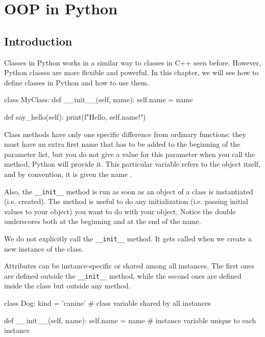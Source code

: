 
\chapter{OOP in Python}

\section{Introduction}

Classes in Python works in a similar way to classes in C++ seen before. However, Python classes are more flexible and powerful. In this chapter, we will see how to define classes in Python and how to use them.

\begin{codeblock}[language=Python]
class MyClass:
    def __init__(self, name):
        self.name = name

    def say_hello(self):
        print(f"Hello, {self.name}!")
\end{codeblock}

\begin{observationblock}
    Class methods have only one specific difference from ordinary functions: they must have an extra
    first name that has to be added to the beginning of the parameter list, but you do not give a value
    for this parameter when you call the method, Python will provide it. This particular variable refers
    to the object itself, and by convention, it is given the name .
\end{observationblock}

Also, the \texttt{\_\_init\_\_} method is run as soon as an object of a class is instantiated (i.e. created). The
method is useful to do any initialization (i.e. passing initial values to your object) you want to do
with your object. Notice the double underscores both at the beginning and at the end of the name.

We do not explicitly call the \texttt{\_\_init\_\_} method. It gets called when we create a new instance of the class.

Attributes can be instance-specific or shared among all instances. The first ones are defined outside the \texttt{\_\_init\_\_} method, while the second ones are defined inside the class but outside any method.

\begin{codeblock}[language=Python]
class Dog:
    kind = 'canine'         # class variable shared by all instances

    def __init__(self, name):
        self.name = name    # instance variable unique to each instance
\end{codeblock}

